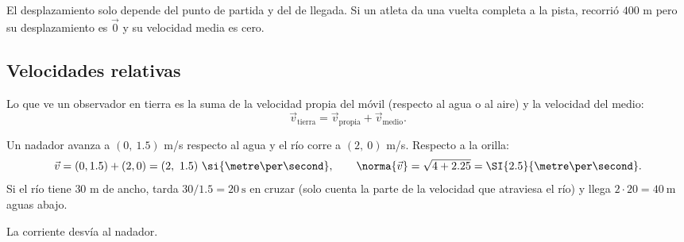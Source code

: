 \documentclass[11pt,a4paper]{article}
\let\nivelbase\nivel
\renewcommand{\nivel}[2]{\Needspace{10\baselineskip}\nivelbase{#1}{#2}}
\begin{document}
\begin{ojo}
El desplazamiento solo depende del punto de partida y del de llegada. Si un atleta da una vuelta completa a la pista,
recorrió $400$ m pero su desplazamiento es $\vec 0$ y su velocidad media es cero.
\end{ojo}

\subsection{Velocidades relativas}
\begin{propiedad}
Lo que ve un observador en tierra es la suma de la velocidad propia del móvil (respecto al agua o al aire) y la
velocidad del medio:
\[ \vec v_{\text{tierra}}=\vec v_{\text{propia}}+\vec v_{\text{medio}} . \]
\end{propiedad}
\begin{minipage}[c]{0.56\linewidth}
\begin{ejemplo}
Un nadador avanza a $(0,\ 1.5)$ m/s respecto al agua y el río corre a $(2,\ 0)$ m/s. Respecto a la orilla:
\[ \vec v=(0,1.5)+(2,0)=(2,\ 1.5)\ \si{\metre\per\second},\qquad \norma{\vec v}=\sqrt{4+2.25}=\SI{2.5}{\metre\per\second}. \]
Si el río tiene $30$ m de ancho, tarda $30/1.5=\SI{20}{\second}$ en cruzar (solo cuenta la parte de la velocidad que
atraviesa el río) y llega $2\cdot20=\SI{40}{\metre}$ aguas abajo.
\end{ejemplo}
\end{minipage}\hfill
\begin{minipage}[c]{0.4\linewidth}\centering
{}

{\small\color{zmute}La corriente desvía al nadador.}
\end{minipage}

\end{document}
